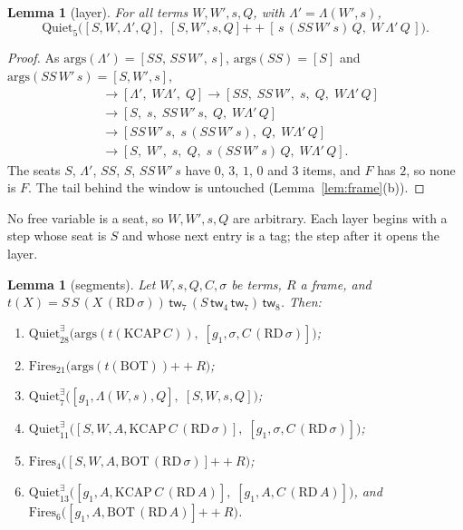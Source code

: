 \documentclass[11pt]{amsart}
\newtheorem{lemma}[theorem]{Lemma}
\theoremstyle{definition}
\newcommand{\app}{\mathbin{+\!\!+}}
\newcommand{\args}{\mathrm{args}}
\newcommand{\tw}[1]{\mathsf{tw}_{#1}}
\newcommand{\Fires}{\mathrm{Fires}}
\newcommand{\Quiet}{\mathrm{Quiet}}
\newcommand{\QuietD}{\mathrm{Quiet}^{\exists}}
\newcommand{\BOT}{\mathrm{BOT}}
\newcommand{\KCAP}{\mathrm{KCAP}}
\newcommand{\RD}{\mathrm{RD}}
\newcommand{\lam}{\Lambda}
\begin{document}
\begin{lemma}[layer]\label{lem:layer}
For all terms $W,W',s,Q$, with $\lam'=\lam(W',s)$,
\[
\Quiet_5\bigl([S,W,\lam',Q],\;[S,W',s,Q]\app[\,s\,(SS\,W'\,s)\,Q,\;W\,\lam'\,Q\,]\bigr).
\]
\end{lemma}

\begin{proof}
As $\args(\lam')=[SS,\,SS\,W',\,s]$, $\args(SS)=[S]$ and $\args(SS\,W'\,s)=[S,W',s]$,
\begin{align*}
[S,W,\lam',Q]&\to[\lam',\;W\lam',\;Q]\to[SS,\;SS\,W',\;s,\;Q,\;W\lam'\,Q]\\
&\to[S,\;s,\;SS\,W'\,s,\;Q,\;W\lam'\,Q]\\
&\to[SS\,W'\,s,\;s\,(SS\,W'\,s),\;Q,\;W\lam'\,Q]\\
&\to[S,\;W',\;s,\;Q,\;s\,(SS\,W'\,s)\,Q,\;W\lam'\,Q].
\end{align*}
The seats $S$, $\lam'$, $SS$, $S$, $SS\,W'\,s$ have $0$, $3$, $1$, $0$ and $3$ items, and $F$
has $2$, so none is $F$. The tail behind the window is untouched (Lemma~\ref{lem:frame}(b)).
\end{proof}

No free variable is a seat, so $W,W',s,Q$ are arbitrary. Each layer begins with a step whose seat
is $S$ and whose next entry is a tag; the step after it opens the layer.

\begin{lemma}[segments]\label{lem:segments}
Let $W,s,Q,C,\sigma$ be terms, $R$ a frame, and
$t(X)=S\,S\,(X\,(\RD\,\sigma))\,\tw7\,(S\,\tw4\,\tw7)\,\tw8$. Then:
\begin{enumerate}
\item[(a)] $\QuietD_{28}\bigl(\args(t(\KCAP\,C)),\;[g_1,\sigma,C\,(\RD\,\sigma)]\bigr)$;
\item[(b)] $\Fires_{21}\bigl(\args(t(\BOT))\app R\bigr)$;
\item[(c)] $\QuietD_7\bigl([g_1,\lam(W,s),Q],\;[S,W,s,Q]\bigr)$;
\item[(d)] $\QuietD_{11}\bigl([S,W,A,\KCAP\,C\,(\RD\,\sigma)],\;
  [g_1,\sigma,C\,(\RD\,\sigma)]\bigr)$;
\item[(e)] $\Fires_4\bigl([S,W,A,\BOT\,(\RD\,\sigma)]\app R\bigr)$;
\item[(f)] $\QuietD_{13}\bigl([g_1,A,\KCAP\,C\,(\RD\,A)],\;[g_1,A,C\,(\RD\,A)]\bigr)$,
  and\\ $\Fires_6\bigl([g_1,A,\BOT\,(\RD\,A)]\app R\bigr)$.
\end{enumerate}
\end{lemma}
\end{document}

